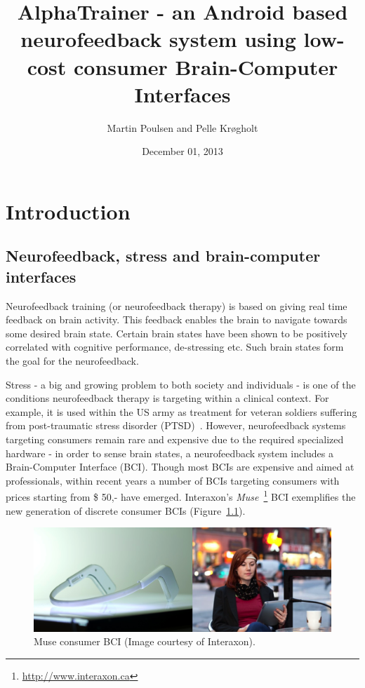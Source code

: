 \documentclass[a4paper,10pt,english,lof,lot,twoside]{puthesis}
\title{AlphaTrainer - an Android based neurofeedback system using low-cost consumer Brain-Computer Interfaces}
\date{December 01, 2013}
\author{Martin Poulsen and Pelle Krøgholt}
\begin{document}
\makefrontmatter

\label{index_tex::doc}



\chapter{Introduction}
\label{ch-intro/index:introduction}\label{ch-intro/index:ch-intro}\label{ch-intro/index::doc}

\section{Neurofeedback, stress and brain-computer interfaces}
\label{ch-intro/index:ch-intro-neurofeedback-stress-and-bci}\label{ch-intro/index:neurofeedback-stress-and-brain-computer-interfaces}
Neurofeedback training (or neurofeedback therapy) is based on giving real time
feedback on brain activity. This feedback enables the brain to navigate towards
some desired brain state. Certain brain states have been shown to be
positively correlated with cognitive performance, de-stressing etc. Such brain
states form the goal for the neurofeedback.

Stress - a big and growing problem to both society and individuals -
is one of the conditions neurofeedback therapy is targeting within a
clinical context. For example, it is used within the US army as treatment
for veteran soldiers suffering from post-traumatic stress disorder
(PTSD) \cite{white_alphatheta_2009}. However,
neurofeedback systems targeting consumers remain rare and expensive
due to the required specialized hardware - in order to sense brain
states, a neurofeedback system includes a Brain-Computer Interface
(BCI). Though most BCIs are expensive and aimed at professionals,
within recent years a number of BCIs targeting consumers with prices
starting from \$ 50,- have emerged. Interaxon's \emph{Muse} \footnote{
\href{http://www.interaxon.ca}{http://www.interaxon.ca}
} BCI exemplifies the new generation of
discrete consumer BCIs (Figure \ref{ch-intro/index:fig-muse-headband}).
\begin{figure}[tbp]
\centering
\capstart

\includegraphics[width=0.800\linewidth]{muse-headband-collage.png}
\caption[Muse consumer BCI]{Muse consumer BCI (Image courtesy of Interaxon).}\label{ch-intro/index:fig-muse-headband}\end{figure}
\end{document}
